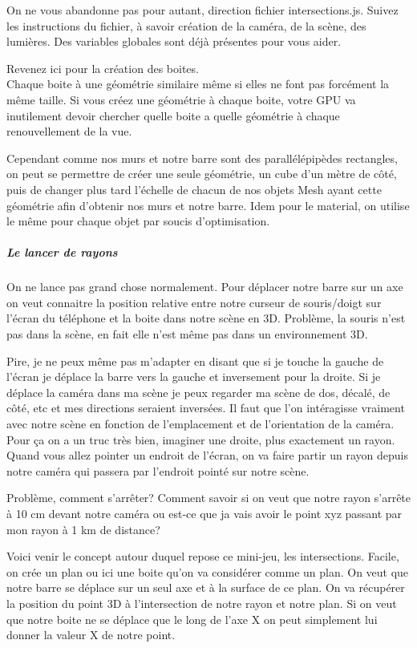 \documentclass[a4paper,10pt]{article}
\begin{document}
On ne vous abandonne pas pour autant, direction fichier intersections.js.
Suivez les instructions du fichier, à savoir création de la caméra, de la scène, des lumières. Des variables globales sont déjà présentes pour vous aider.

Revenez ici pour la création des boites.\\
Chaque boite à une géométrie similaire même si elles ne font pas forcément la même taille. Si vous créez une géométrie à chaque boite, votre GPU va inutilement devoir chercher quelle boite a quelle géométrie à chaque renouvellement de la vue.

Cependant comme nos murs et notre barre sont des parallélépipèdes rectangles, on peut se permettre de créer une seule géométrie, un cube d'un mètre de côté, puis de changer plus tard l'échelle de chacun de nos objets Mesh ayant cette géométrie afin d'obtenir nos murs et notre barre.
Idem pour le material, on utilise le même pour chaque objet par soucis d'optimisation.
\subparagraph{Le lancer de rayons}
On ne lance pas grand chose normalement. Pour déplacer notre barre sur un axe on veut connaitre la position relative entre notre curseur de souris/doigt sur l'écran du téléphone et la boite dans notre scène en 3D.
Problème, la souris n'est pas dans la scène, en fait elle n'est même pas dans un environnement 3D.

Pire, je ne peux même pas m'adapter en disant que si je touche la gauche de l'écran je déplace la barre vers la gauche et inversement pour la droite.
Si je déplace la caméra dans ma scène je peux regarder ma scène de dos, décalé, de côté, etc et mes directions seraient inversées. Il faut que l'on intéragisse vraiment avec notre scène en fonction de l'emplacement et de l'orientation de la caméra.
Pour ça on a un truc très bien, imaginer une droite, plus exactement un rayon. Quand vous allez pointer un endroit de l'écran, on va faire partir un rayon depuis notre caméra qui passera par l'endroit pointé sur notre scène.

Problème, comment s'arrêter? Comment savoir si on veut que notre rayon s'arrête à 10 cm devant notre caméra ou est-ce que ja vais avoir le point xyz passant par mon rayon à 1 km de distance?

Voici venir le concept autour duquel repose ce mini-jeu, les intersections. Facile, on crée un plan ou ici une boite qu'on va considérer comme un plan. On veut que notre barre se déplace sur un seul axe et à la surface de ce plan. On va récupérer la position du point 3D à l'intersection de notre rayon et notre plan. Si on veut que notre boite ne se déplace que le long de l'axe X on peut simplement lui donner la valeur X de notre point.
\end{document}
